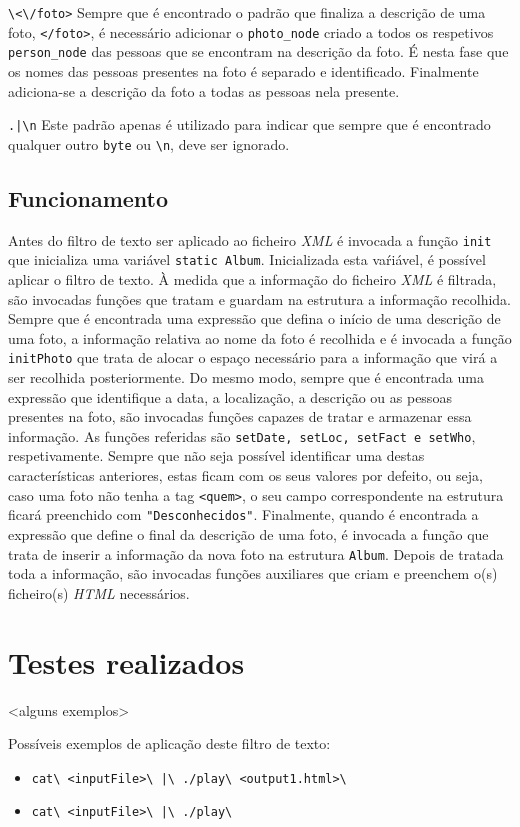 \verb!\<\/foto>!
Sempre que é encontrado o padrão que finaliza a descrição de uma foto, \verb!</foto>!, é necessário adicionar o \verb!photo_node! criado a todos os respetivos \verb!person_node! das pessoas que se encontram na descrição da foto. É nesta fase que os nomes das pessoas presentes na foto é separado e identificado. Finalmente adiciona-se a descrição da foto a todas as pessoas nela presente.

\verb!.|\n!
Este padrão apenas é utilizado para indicar que sempre que é encontrado qualquer outro \verb!byte! ou \verb!\n!, deve ser ignorado.

\subsection{Funcionamento}
\label{seq:museu-func}
Antes do filtro de texto ser aplicado ao ficheiro \emph{XML} é invocada a função \verb!init! que inicializa uma variável \verb!static Album!. Inicializada esta vaŕiável, é possível aplicar o filtro de texto.
À medida que a informação do ficheiro \emph{XML} é filtrada, são invocadas funções que tratam e guardam na estrutura a informação recolhida.
Sempre que é encontrada uma expressão que defina o início de uma descrição de uma foto, a informação relativa ao nome da foto é recolhida e é invocada a função \verb!initPhoto! que trata de alocar o espaço necessário para a informação que virá a ser recolhida posteriormente. Do mesmo modo, sempre que é encontrada uma expressão que identifique a data, a localização, a descrição ou as pessoas presentes na foto, são invocadas funções capazes de tratar e armazenar essa informação. As funções referidas são \verb!setDate, setLoc, setFact e setWho!, respetivamente. Sempre que não seja possível identificar uma destas características anteriores, estas ficam com os seus valores por defeito, ou seja, caso uma foto não tenha a tag \verb!<quem>!, o seu campo correspondente na estrutura ficará preenchido com \verb!"Desconhecidos"!. Finalmente, quando é encontrada a expressão que define o final da descrição de uma foto, é invocada a função que trata de inserir a informação da nova foto na estrutura \verb!Album!.
Depois de tratada toda a informação, são invocadas funções auxiliares que criam e preenchem o(s) ficheiro(s) \emph{HTML} necessários.

\section{Testes realizados}
\label{seq:museu-test}
<alguns exemplos>

Possíveis exemplos de aplicação deste filtro de texto:
\begin{itemize}
\item\verb!cat\ <inputFile>\ |\ ./play\ <output1.html>\ !
\item\verb!cat\ <inputFile>\ |\ ./play\ !
\end{itemize}
